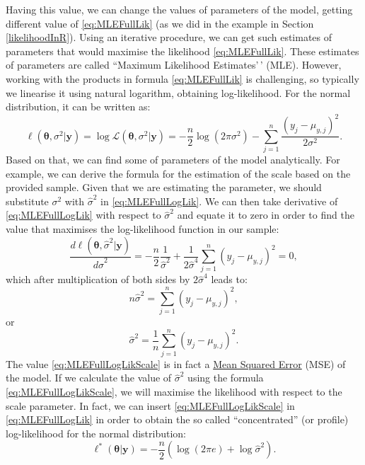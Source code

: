\documentclass[
]{book}
\theoremstyle{definition}
\theoremstyle{definition}
\theoremstyle{definition}
\theoremstyle{definition}
\theoremstyle{remark}
\begin{document}
Having this value, we can change the values of parameters of the model, getting different value of \eqref{eq:MLEFullLik} (as we did in the example in Section \ref{likelihoodInR}). Using an iterative procedure, we can get such estimates of parameters that would maximise the likelihood \eqref{eq:MLEFullLik}. These estimates of parameters are called ``Maximum Likelihood Estimates'\,' (MLE). However, working with the products in formula \eqref{eq:MLEFullLik} is challenging, so typically we linearise it using natural logarithm, obtaining log-likelihood. For the normal distribution, it can be written as:
\begin{equation}
    \ell (\boldsymbol{\theta}, {\sigma}^2 | \mathbf{y}) = \log \mathcal{L} (\boldsymbol{\theta}, {\sigma}^2 | \mathbf{y}) = -\frac{n}{2} \log(2 \pi \sigma^2) -\sum_{j=1}^n \frac{\left(y_j - \mu_{y,j} \right)^2}{2 \sigma^2} .
    \label{eq:MLEFullLogLik}
\end{equation}
Based on that, we can find some of parameters of the model analytically. For example, we can derive the formula for the estimation of the scale based on the provided sample. Given that we are estimating the parameter, we should substitute \(\sigma^2\) with \(\hat{\sigma}^2\) in \eqref{eq:MLEFullLogLik}. We can then take derivative of \eqref{eq:MLEFullLogLik} with respect to \(\hat{\sigma}^2\) and equate it to zero in order to find the value that maximises the log-likelihood function in our sample:
\begin{equation}
    \frac{d \ell (\boldsymbol{\theta}, \hat{\sigma}^2 | \mathbf{y})}{d \hat{\sigma}^2} = -\frac{n}{2} \frac{1}{\hat{\sigma}^2} + \frac{1}{2 \hat{\sigma}^4}\sum_{j=1}^n \left(y_j - \mu_{y,j} \right)^2 =0 , 
    \label{eq:MLEFullLogLikScale01}
\end{equation}
which after multiplication of both sides by \(2 \hat{\sigma}^4\) leads to:
\begin{equation}
    n \hat{\sigma}^2 = \sum_{j=1}^n \left(y_j - \mu_{y,j} \right)^2 , 
    \label{eq:MLEFullLogLikScale02}
\end{equation}
or
\begin{equation}
    \hat{\sigma}^2 = \frac{1}{n}\sum_{j=1}^n \left(y_j - \mu_{y,j} \right)^2 .
    \label{eq:MLEFullLogLikScale}
\end{equation}
The value \eqref{eq:MLEFullLogLikScale} is in fact a \protect\hyperlink{errorMeasures}{Mean Squared Error} (MSE) of the model. If we calculate the value of \(\hat{\sigma}^2\) using the formula \eqref{eq:MLEFullLogLikScale}, we will maximise the likelihood with respect to the scale parameter. In fact, we can insert \eqref{eq:MLEFullLogLikScale} in \eqref{eq:MLEFullLogLik} in order to obtain the so called ``concentrated'' (or profile) log-likelihood for the normal distribution:
\begin{equation}
    \ell^* (\boldsymbol{\theta} | \mathbf{y}) = -\frac{n}{2}\left( \log(2 \pi e) + \log \hat{\sigma}^2 \right) .
    \label{eq:MLEFullLogLikConcentrated}
\end{equation}
\end{document}
